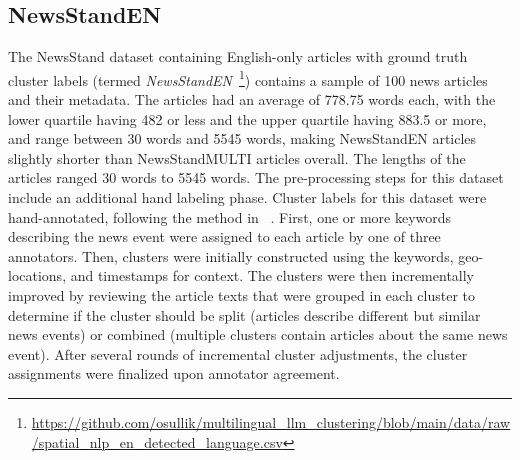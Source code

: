 \subsection{NewsStandEN}

The NewsStand dataset containing English-only articles with ground truth cluster labels (termed \emph{NewsStandEN}~\footnote{\url{https://github.com/osullik/multilingual_llm_clustering/blob/main/data/raw/spatial_nlp_en_detected_language.csv}}) contains a sample of 100 news articles and their metadata.
The articles had an average of 778.75 words each, with the lower quartile having 482 or less and the upper quartile having 883.5 or more, and range between 30 words and 5545 words, making NewsStandEN articles slightly shorter than NewsStandMULTI articles overall.
The lengths of the articles ranged 30 words to 5545 words.
The pre-processing steps for this dataset include an additional hand labeling phase.
Cluster labels for this dataset were hand-annotated, following the method in \citeauthor{Zhang2023}~\cite{Zhang2023}.
First, one or more keywords describing the news event were assigned to each article by one of three annotators.
Then, clusters were initially constructed using the keywords, geo-locations, and timestamps for context.
The clusters were then incrementally improved by reviewing the article texts that were grouped in each cluster to determine if the cluster should be split (articles describe different but similar news events) or combined (multiple clusters contain articles about the same news event).
After several rounds of incremental cluster adjustments, the cluster assignments were finalized upon annotator agreement.